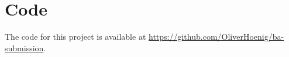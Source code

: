 \section{Code}

The code for this project is available at \url{https://github.com/OliverHoenig/ba-submission}.